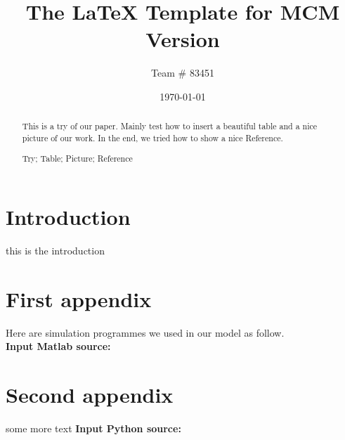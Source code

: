 \documentclass{mcmthesis}
\title{The \LaTeX{} Template for MCM Version \MCMversion}
\author{\small Team \# 83451}
\date{\today}
\begin{document}
\begin{abstract}

This is a try of our paper. Mainly test how to insert a beautiful table and a nice picture of our work. In the end, we tried how to show a nice Reference.

\begin{keywords}
  Try; Table; Picture; Reference
\end{keywords}
\end{abstract}
\maketitle

\tableofcontents
\newpage

\section{Introduction}

this is the introduction

%
% 
% 

\newpage
\begin{appendices}

  \section{First appendix}

    Here are simulation programmes we used in our model as follow.\\

    \textbf{\textcolor[rgb]{0.98,0.00,0.00}{Input Matlab source:}}


  \section{Second appendix}

    some more text \textcolor[rgb]{0.98,0.00,0.00}{\textbf{Input Python source:}}


\end{appendices}
\end{document}
